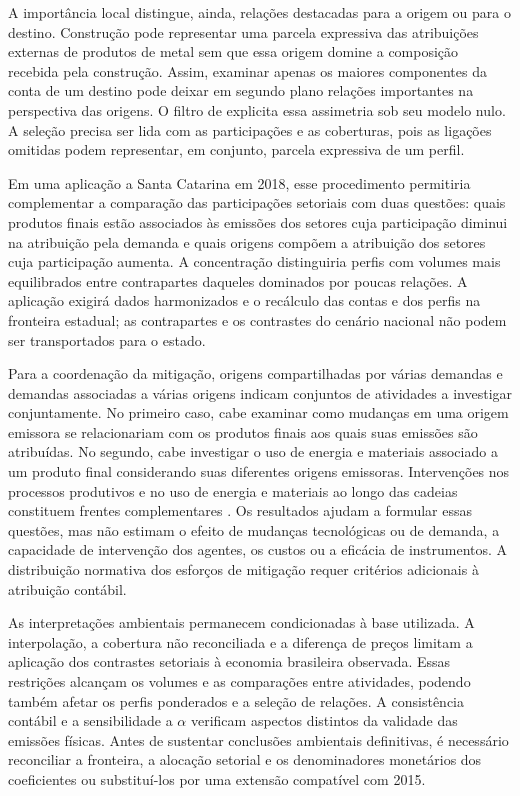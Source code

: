\documentclass[12pt]{article}
\begin{document}
A importância local distingue, ainda, relações destacadas para a origem ou para o destino. Construção pode representar uma parcela expressiva das atribuições externas de produtos de metal sem que essa origem domine a composição recebida pela construção. Assim, examinar apenas os maiores componentes da conta de um destino pode deixar em segundo plano relações importantes na perspectiva das origens. O filtro de \textcite{serrano2009} explicita essa assimetria sob seu modelo nulo. A seleção precisa ser lida com as participações e as coberturas, pois as ligações omitidas podem representar, em conjunto, parcela expressiva de um perfil.

Em uma aplicação a Santa Catarina em 2018, esse procedimento permitiria complementar a comparação das participações setoriais com duas questões: quais produtos finais estão associados às emissões dos setores cuja participação diminui na atribuição pela demanda e quais origens compõem a atribuição dos setores cuja participação aumenta. A concentração distinguiria perfis com volumes mais equilibrados entre contrapartes daqueles dominados por poucas relações. A aplicação exigirá dados harmonizados e o recálculo das contas e dos perfis na fronteira estadual; as contrapartes e os contrastes do cenário nacional não podem ser transportados para o estado.

Para a coordenação da mitigação, origens compartilhadas por várias demandas e demandas associadas a várias origens indicam conjuntos de atividades a investigar conjuntamente. No primeiro caso, cabe examinar como mudanças em uma origem emissora se relacionariam com os produtos finais aos quais suas emissões são atribuídas. No segundo, cabe investigar o uso de energia e materiais associado a um produto final considerando suas diferentes origens emissoras. Intervenções nos processos produtivos e no uso de energia e materiais ao longo das cadeias constituem frentes complementares \parencite{rissman2020}. Os resultados ajudam a formular essas questões, mas não estimam o efeito de mudanças tecnológicas ou de demanda, a capacidade de intervenção dos agentes, os custos ou a eficácia de instrumentos. A distribuição normativa dos esforços de mitigação requer critérios adicionais à atribuição contábil.

As interpretações ambientais permanecem condicionadas à base utilizada. A interpolação, a cobertura não reconciliada e a diferença de preços limitam a aplicação dos contrastes setoriais à economia brasileira observada. Essas restrições alcançam os volumes e as comparações entre atividades, podendo também afetar os perfis ponderados e a seleção de relações. A consistência contábil e a sensibilidade a $\alpha$ verificam aspectos distintos da validade das emissões físicas. Antes de sustentar conclusões ambientais definitivas, é necessário reconciliar a fronteira, a alocação setorial e os denominadores monetários dos coeficientes ou substituí-los por uma extensão compatível com 2015.
\end{document}
